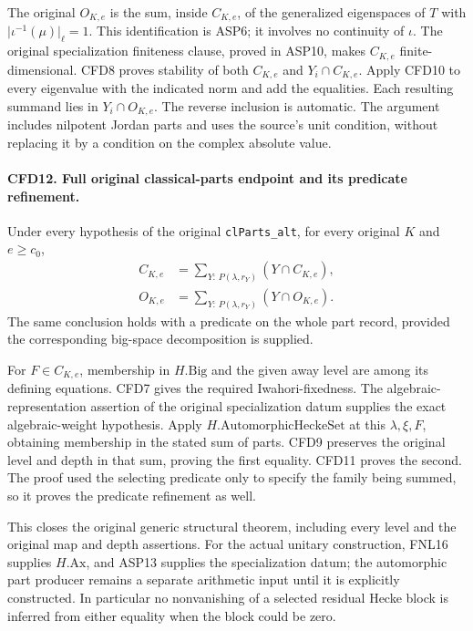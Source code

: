 The original \(O_{K,e}\) is the sum, inside \(C_{K,e}\), of the
generalized eigenspaces of \(T\) with
\(\lvert\iota^{-1}(\mu)\rvert_\ell=1\).  This identification is ASP6;
it involves no continuity of \(\iota\).  The original specialization
finiteness clause, proved in ASP10, makes \(C_{K,e}\) finite-dimensional.
CFD8 proves stability of both \(C_{K,e}\) and \(Y_i\cap C_{K,e}\).
Apply CFD10 to every eigenvalue with the indicated norm and add the
equalities.  Each resulting summand lies in \(Y_i\cap O_{K,e}\).
The reverse inclusion is automatic.  The argument includes nilpotent
Jordan parts and uses the source's unit condition, without replacing it
by a condition on the complex absolute value.

\paragraph{CFD12. Full original classical-parts endpoint and its predicate refinement.}
\label{claim:CFD12}
Under every hypothesis of the original \texttt{clParts\_alt}, for every
original \(K\) and \(e\ge c_0\),
\begin{align*}
 C_{K,e}&=\sum_{Y:\,P(\lambda,r_Y)}(Y\cap C_{K,e}),\\
 O_{K,e}&=\sum_{Y:\,P(\lambda,r_Y)}(Y\cap O_{K,e}).
\end{align*}
The same conclusion holds with a predicate on the whole part record,
provided the corresponding big-space decomposition is supplied.

For \(F\in C_{K,e}\), membership in \(H.\mathrm{Big}\) and the
given away level are among its defining equations.  CFD7 gives the
required Iwahori-fixedness.  The algebraic-representation assertion of
the original specialization datum supplies the exact algebraic-weight
hypothesis.  Apply \(H.\mathrm{AutomorphicHeckeSet}\) at this
\(\lambda,\xi,F\), obtaining membership in the stated sum of parts.
CFD9 preserves the original level and depth in that sum, proving the
first equality.  CFD11 proves the second.  The proof used the selecting
predicate only to specify the family being summed, so it proves the
predicate refinement as well.

This closes the original generic structural theorem, including every
level and the original map and depth assertions.  For the actual unitary
construction, FNL16 supplies \(H.\mathrm{Ax}\), and ASP13 supplies
the specialization datum; the automorphic part producer remains a
separate arithmetic input until it is explicitly constructed.  In
particular no nonvanishing of a selected residual Hecke block is inferred
from either equality when the block could be zero.
